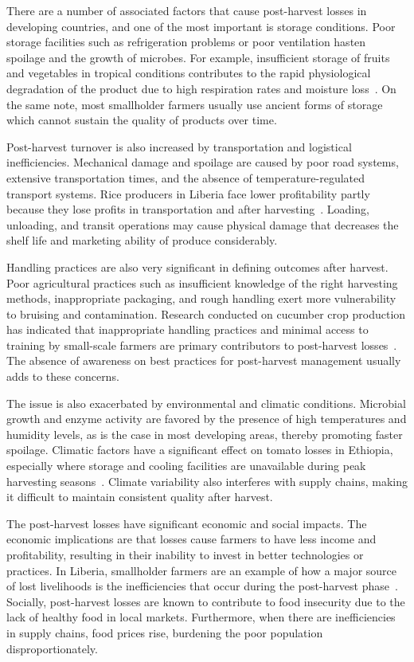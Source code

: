 There are a number of associated factors that cause post-harvest losses in developing countries,
and one of the most important is storage conditions. Poor storage facilities such as refrigeration
problems or poor ventilation hasten spoilage and the growth of microbes. For example, insufficient
storage of fruits and vegetables in tropical conditions contributes to the rapid physiological
degradation of the product due to high respiration rates and moisture
loss~\cite{rajapaksha2021reducing}. On the same note, most smallholder farmers usually use ancient
forms of storage which cannot sustain the quality of products over time.

Post-harvest turnover is also increased by transportation and logistical inefficiencies. Mechanical
damage and spoilage are caused by poor road systems, extensive transportation times, and the
absence of temperature-regulated transport systems. Rice producers in Liberia face lower
profitability partly because they lose profits in transportation and after
harvesting~\cite{pluato2024impact}. Loading, unloading, and transit operations may cause physical
damage that decreases the shelf life and marketing ability of produce considerably.

Handling practices are also very significant in defining outcomes after harvest. Poor agricultural
practices such as insufficient knowledge of the right harvesting methods, inappropriate packaging,
and rough handling exert more vulnerability to bruising and contamination. Research conducted on
cucumber crop production has indicated that inappropriate handling practices and minimal access to
training by small-scale farmers are primary contributors to post-harvest
losses~\cite{ukwuaba2024mitigating}. The absence of awareness on best practices for post-harvest
management usually adds to these concerns.

The issue is also exacerbated by environmental and climatic conditions. Microbial growth and enzyme
activity are favored by the presence of high temperatures and humidity levels, as is the case in
most developing areas, thereby promoting faster spoilage. Climatic factors have a significant effect
on tomato losses in Ethiopia, especially where storage and cooling facilities are unavailable during
peak harvesting seasons~\cite{wakene2024comprehensive}. Climate variability also interferes with
supply chains, making it difficult to maintain consistent quality after harvest.

The post-harvest losses have significant economic and social impacts. The economic implications are
that losses cause farmers to have less income and profitability, resulting in their inability to
invest in better technologies or practices. In Liberia, smallholder farmers are an example of how a
major source of lost livelihoods is the inefficiencies that occur during the post-harvest
phase~\cite{pluato2024impact}. Socially, post-harvest losses are known to contribute to food
insecurity due to the lack of healthy food in local markets. Furthermore, when there are
inefficiencies in supply chains, food prices rise, burdening the poor population
disproportionately.

